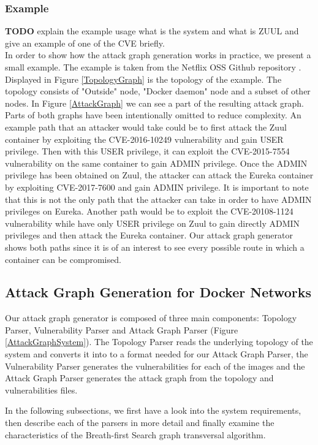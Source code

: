 \subsubsection{Example}
\textbf{TODO}  explain the example usage what is the system and what is ZUUL and give an example of one of the CVE briefly.\\
In order to show how the attack graph generation works in practice, we present a small example. The example is taken from the Netflix OSS Github repository \cite{netflixoss}. Displayed in Figure \ref{TopologyGraph} is the topology of the example. The topology consists of "Outside" node, "Docker daemon" node and a subset of other nodes. In Figure \ref{AttackGraph} we can see a part of the resulting attack graph. Parts of both graphs have been intentionally omitted to reduce complexity. An example path that an attacker would take could be to first attack the Zuul container by exploiting the CVE-2016-10249 vulnerability and gain USER privilege. Then with this USER privilege, it can exploit the CVE-2015-7554 vulnerability on the same container to gain ADMIN privilege. Once the ADMIN privilege has been obtained on Zuul, the attacker can attack the Eureka container by exploiting CVE-2017-7600 and gain ADMIN privilege. It is important to note that this is not the only path that the attacker can take in order to have ADMIN privileges on Eureka. Another path would be to exploit the CVE-20108-1124 vulnerability while have only USER privilege on Zuul to gain directly ADMIN privileges and then attack the Eureka container. Our attack graph generator shows both paths since it is of an interest to see every possible route in which a container can be compromised.



\subsection{Attack Graph Generation for Docker Networks}
\label{chap:technical}
Our attack graph generator is composed of three main components: Topology Parser, Vulnerability Parser and Attack Graph Parser (Figure \ref{AttackGraphSystem}). The Topology Parser reads the underlying topology of the system and converts it into to a format needed for our Attack Graph Parser, the Vulnerability Parser generates the vulnerabilities for each of the images and the Attack Graph Parser generates the attack graph from the topology and vulnerabilities files. 


In the following subsections, we first have a look into the system requirements, then describe each of the parsers in more detail and finally examine the characteristics of the Breath-first Search graph transversal algorithm.

